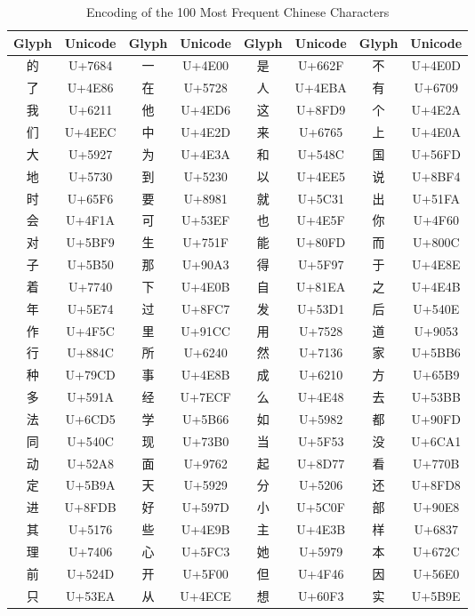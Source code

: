 \begin{CJK}{UTF8}{gbsn} %
\begin{table}[!th]
\centering
\begin{tabular}{|c|c|c|c|c|c|c|c|}
\hline
\textbf{Glyph} & \textbf{Unicode} & \textbf{Glyph} & \textbf{Unicode} & \textbf{Glyph} & \textbf{Unicode}  & \textbf{Glyph} & \textbf{Unicode} \\
\hline
的 & U+7684 & 一 & U+4E00 & 是 & U+662F & 不 & U+4E0D \\
了 & U+4E86 & 在 & U+5728 & 人 & U+4EBA & 有 & U+6709 \\
我 & U+6211 & 他 & U+4ED6 & 这 & U+8FD9 & 个 & U+4E2A \\
们 & U+4EEC & 中 & U+4E2D & 来 & U+6765 & 上 & U+4E0A \\
大 & U+5927 & 为 & U+4E3A & 和 & U+548C & 国 & U+56FD \\
地 & U+5730 & 到 & U+5230 & 以 & U+4EE5 & 说 & U+8BF4 \\
时 & U+65F6 & 要 & U+8981 & 就 & U+5C31 & 出 & U+51FA \\
会 & U+4F1A & 可 & U+53EF & 也 & U+4E5F & 你 & U+4F60 \\
对 & U+5BF9 & 生 & U+751F & 能 & U+80FD & 而 & U+800C \\
子 & U+5B50 & 那 & U+90A3 & 得 & U+5F97 & 于 & U+4E8E \\
着 & U+7740 & 下 & U+4E0B & 自 & U+81EA & 之 & U+4E4B \\
年 & U+5E74 & 过 & U+8FC7 & 发 & U+53D1 & 后 & U+540E \\
作 & U+4F5C & 里 & U+91CC & 用 & U+7528 & 道 & U+9053 \\
行 & U+884C & 所 & U+6240 & 然 & U+7136 & 家 & U+5BB6 \\
种 & U+79CD & 事 & U+4E8B & 成 & U+6210 & 方 & U+65B9 \\
多 & U+591A & 经 & U+7ECF & 么 & U+4E48 & 去 & U+53BB \\
法 & U+6CD5 & 学 & U+5B66 & 如 & U+5982 & 都 & U+90FD \\
同 & U+540C & 现 & U+73B0 & 当 & U+5F53 & 没 & U+6CA1 \\
动 & U+52A8 & 面 & U+9762 & 起 & U+8D77 & 看 & U+770B \\
定 & U+5B9A & 天 & U+5929 & 分 & U+5206 & 还 & U+8FD8 \\
进 & U+8FDB & 好 & U+597D & 小 & U+5C0F & 部 & U+90E8 \\
其 & U+5176 & 些 & U+4E9B & 主 & U+4E3B & 样 & U+6837 \\
理 & U+7406 & 心 & U+5FC3 & 她 & U+5979 & 本 & U+672C \\
前 & U+524D & 开 & U+5F00 & 但 & U+4F46 & 因 & U+56E0 \\
只 & U+53EA & 从 & U+4ECE & 想 & U+60F3 & 实 & U+5B9E \\
\hline
\end{tabular}
\caption{ Encoding of the 100 Most Frequent Chinese Characters}
\label{tab:chinese_table}
\end{table}
\end{CJK}
